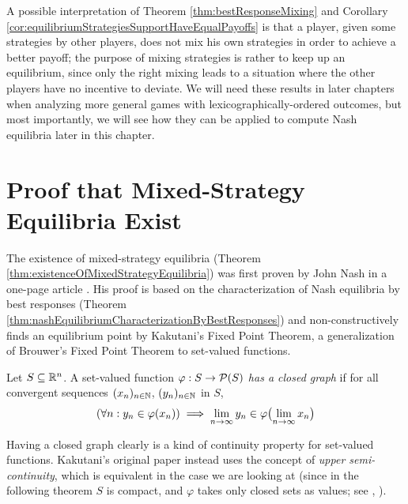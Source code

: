 \documentclass[a4paper]{scrreprt}
\let\phi\varphi
\begin{document}
    A possible interpretation of Theorem \ref{thm:bestResponseMixing} and Corollary \ref{cor:equilibriumStrategiesSupportHaveEqualPayoffs} is that a player, given some strategies by other players, does not mix his own strategies in order to achieve a better payoff; the purpose of mixing strategies is rather to keep up an equilibrium, since only the right mixing leads to a situation where the other players have no incentive to deviate.
    We will need these results in later chapters when analyzing more general games with lexicographically-ordered outcomes, but most importantly, we will see how they can be applied to compute Nash equilibria later in this chapter.
    
    \section{Proof that Mixed-Strategy Equilibria Exist}
    \label{sec:existenceOfMixedStrategyEquilibria}
    The existence of mixed-strategy equilibria (Theorem \ref{thm:existenceOfMixedStrategyEquilibria}) was first proven by John Nash in a one-page article \cite{bib:nashOnePageProofOfEquilibria}.
    His proof is based on the characterization of Nash equilibria by best responses (Theorem \ref{thm:nashEquilibriumCharacterizationByBestResponses}) and non-constructively finds an equilibrium point by Kakutani's Fixed Point Theorem, a generalization of Brouwer's Fixed Point Theorem to set-valued functions.
    
    \begin{defn}[eg. {\cite[p.30]{bib:fudenbergGameTheory}}]
        Let $S \subseteq \mathbb{R}^n$. A set-valued function $\phi: S \to \Pot(S)$ \emph{has a closed graph} if for all convergent sequences $(x_n)_{n \in \mathbb{N}}$, $(y_n)_{n \in \mathbb{N}}$ in $S$,
        \[
            (\forall n: y_n \in \phi(x_n)) \implies \liminfty{n} y_n \in \phi\bigpars{\liminfty{n} x_n}
        \]
    \end{defn}

    Having a closed graph clearly is a kind of continuity property for set-valued functions.
    Kakutani's original paper instead uses the concept of \emph{upper semi-continuity}, which is equivalent in the case we are looking at (since in the following theorem $S$ is compact, and $\phi$ takes only closed sets as values; see \cite{bib:kakutaniFixedPointTheorem}, \cite{bib:borderFixedPointTheorems}).
\end{document}
